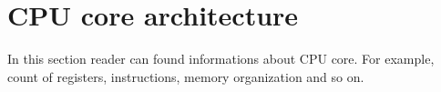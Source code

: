 \section{CPU core architecture}

In this section reader can found informations about CPU core. For example,
count of registers, instructions, memory organization and so on.
